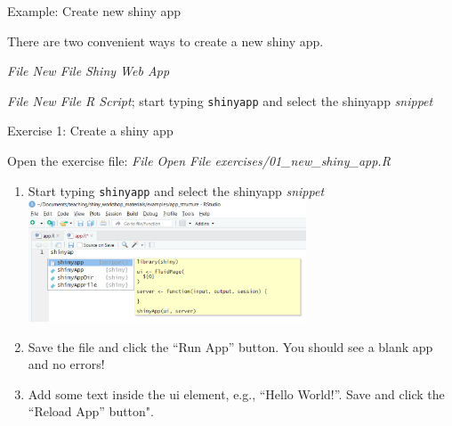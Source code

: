 \documentclass[
  12pt,
  ignorenonframetext,
]{beamer}
\providecommand{\tightlist}{%
  \setlength{\itemsep}{0pt}\setlength{\parskip}{0pt}}
\begin{document}
\begin{frame}[fragile]{Example: Create new shiny app}
\protect\hypertarget{example-create-new-shiny-app}{}

There are two convenient ways to create a new shiny app.

\begin{description}
\tightlist
\item[Option 1: Create a new shiny web app from example]
\emph{File \rightarrow New File \rightarrow Shiny Web App}
\item[Option 2: Create a new shiny app from a template]
\emph{File \rightarrow New File \rightarrow R Script}; start typing
\texttt{shinyapp} and select the shinyapp \emph{snippet}
\end{description}

\end{frame}

\begin{frame}[fragile]{Exercise 1: Create a shiny app}
\protect\hypertarget{exercise-1-create-a-shiny-app}{}

Open the exercise file: \emph{File \rightarrow Open File
\rightarrow exercises/01\_new\_shiny\_app.R}

\begin{enumerate}
\item
  Start typing \texttt{shinyapp} and select the shinyapp \emph{snippet}
  \includegraphics[width=0.65\textwidth,height=\textheight]{./img/shiny_snippet.png}
\item
  Save the file and click the ``Run App'' button. You should see a blank
  app and no errors!
\item
  Add some text inside the ui element, e.g., ``Hello World!''. Save and
  click the ``Reload App'' button".
\end{enumerate}

\end{frame}
\end{document}
